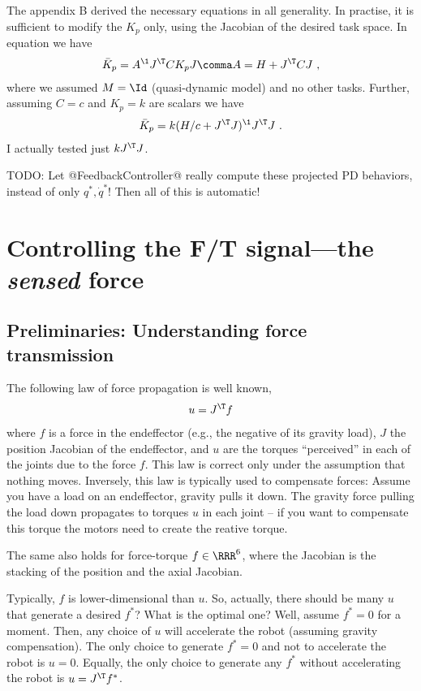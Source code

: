 \documentclass[10pt,fleqn,twoside]{article}
\begin{document}
The appendix B derived the necessary equations in all generality. In
practise, it is sufficient to modify the $K_p$ only, using the
Jacobian of the desired task space. In equation  we have
\begin{align}
\bar K_p = A^\1 J^\T C K_p J \comma A = H + J^\T C J ~,
\end{align}
where we assumed $M=\Id$ (quasi-dynamic model) and no other
tasks. Further, assuming $C=c$ and $K_p=k$ are scalars we have
\begin{align}
\bar K_p = k(H/c+J^\T J)^\1 J^\T J ~.
\end{align}
I actually tested just $k J^\T J$.

TODO: Let @FeedbackController@ really compute these projected PD
behaviors, instead of only $q^*,\dot q^*$! Then all of this is
automatic!



\section{Controlling the F/T signal---the \emph{sensed} force}

\subsection{Preliminaries: Understanding force transmission}

The following law of force propagation is well known,
\begin{align}\label{eqForce}
u = J^\T f
\end{align}
where $f$ is a force in the endeffector (e.g., the negative
of its gravity load), $J$ the position Jacobian of the endeffector,
and $u$ are the torques ``perceived'' in each of the joints due to the
force $f$. This law is correct only under the assumption that nothing
moves. Inversely, this law is typically used to compensate forces:
Assume you have a load on an endeffector, gravity pulls it down. The
gravity force pulling the load down propagates to torques $u$ in each
joint -- if you want to compensate this torque the motors need to
create the reative torque.

The same also holds for force-torque $f\in\RRR^6$, where the Jacobian
is the stacking of the position and the axial Jacobian.

Typically, $f$ is lower-dimensional than $u$. So, actually, there
should be many $u$ that generate a desired $f^*$? What is the optimal
one? Well, assume $f^*=0$ for a moment. Then, any choice of $u$ will
accelerate the robot (assuming gravity compensation). The only choice
to generate $f^*=0$ and not to accelerate the robot is $u=0$. Equally,
the only choice to generate any $f^*$ without accelerating the robot
is $u = J^\T f^*$.
\end{document}
